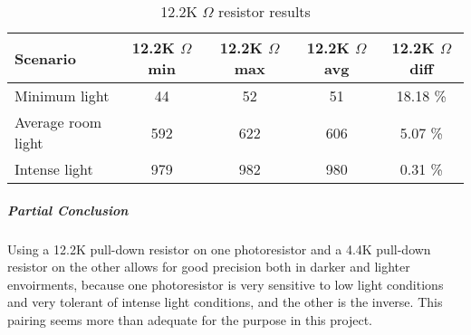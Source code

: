 \begin{table}[H]
  \centering
  \begin{tabular}{l c c c c}
    Scenario & 12.2K $\Omega$ min & 12.2K $\Omega$ max & 12.2K $\Omega$ avg & 12.2K $\Omega$ diff \\
    \hline
    Minimum light & 44 & 52 & 51 & 18.18 \% \\
    Average room light & 592 & 622 & 606 & 5.07 \% \\
    Intense light & 979 & 982 & 980 & 0.31 \% \\
  \end{tabular}
  \caption{12.2K $\Omega$ resistor results}\label{tab:12.2KTestResults}
\end{table}

\subparagraph{Partial Conclusion}
Using a 12.2K pull-down resistor on one photoresistor and a 4.4K pull-down resistor on the other allows for good precision both in darker and lighter envoirments, because one photoresistor is very sensitive to low light conditions and very tolerant of intense light conditions, and the other is the inverse. This pairing seems more than adequate for the purpose in this project.
